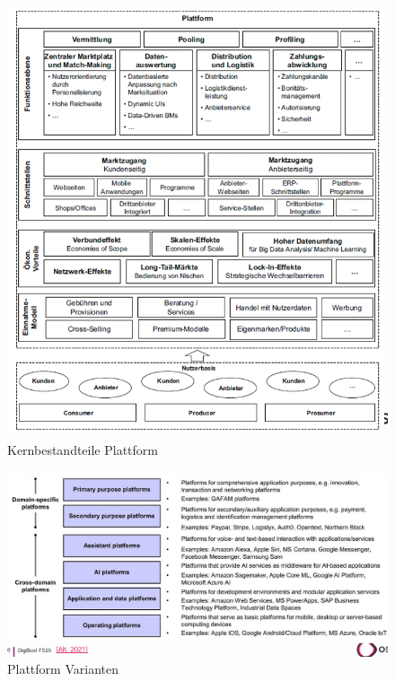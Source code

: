 \documentclass[../Main.tex]{subfiles}
\begin{document}
\begin{figure}[H]
    \centering
    \includegraphics[width=1\linewidth]{Images/digbus/kernplattform.png}
    \caption{Kernbestandteile Plattform}
\end{figure}

\begin{figure}[H]
    \centering
    \includegraphics[width=1\linewidth]{Images/digbus/platformvar.png}
    \caption{Plattform Varianten}
\end{figure}
\end{document}
